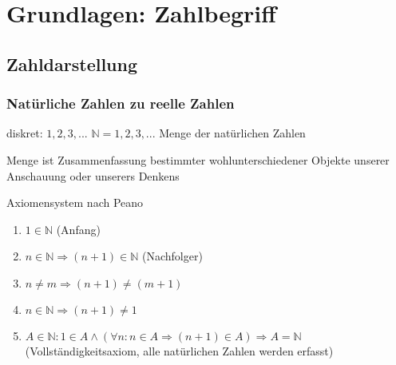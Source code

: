 \chapter{Grundlagen: Zahlbegriff}



\section{Zahldarstellung}
\subsection{Natürliche Zahlen zu reelle Zahlen}
diskret: $1,2,3,...$
$\mathbb{N} = {1,2,3,...}$ Menge der natürlichen Zahlen
\begin{definition}
 Menge ist Zusammenfassung bestimmter wohlunterschiedener Objekte unserer Anschauung oder unserers Denkens
\end{definition}

Axiomensystem nach Peano
\begin{enumerate}
 \item $1 \in \mathbb{N}$ (Anfang)
 \item $n \in \mathbb{N} \Rightarrow (n+1) \in \mathbb{N}$ (Nachfolger)
 \item $n \neq m \Rightarrow (n+1) \neq (m+1)$
 \item $n \in \mathbb{N} \Rightarrow (n+1) \neq 1$
 \item $A \in \mathbb{N}: 1 \in A \land (\forall n: n \in A \Rightarrow (n+1) \in A) \Rightarrow A = \mathbb{N}$ (Vollständigkeitsaxiom, alle natürlichen Zahlen werden erfasst)
\end{enumerate}

